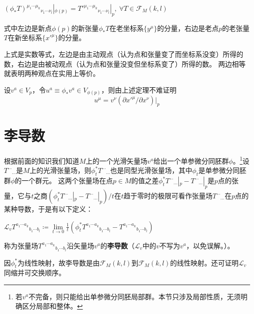 \begin{theorem}
	$(\phi_*T)^{\mu_1 \cdots \mu_k}{}_{\nu_1 \cdots \nu_l}|_{\phi(p)} = T'^{\mu_1 \cdots \mu_k}{}_{\nu_1 \cdots \nu_l}|_p, ~ \forall T \in \mathscr{F}_M(k, l)$

	式中左边是新点$\phi(p)$的新张量$\phi_*T$在老坐标系$\{y^\mu\}$的分量，右边是老点$p$的老张量$T$在新坐标系$\{x'^\mu\}$的分量。
\end{theorem}

\begin{note}
	上式是实数等式，左边是由主动观点（认为点和张量变了而坐标系没变）所得的数，右边是由被动观点（认为点和张量没变但坐标系变了）所得的数。
	两边相等就表明两种观点在实用上等价。
\end{note}

\begin{example}
	设$v^a \in V_p$，令$u^a \equiv \phi_*v^a \in V_{\phi(p)}$，则由上述定理不难证明
	$$u^\mu = v^\nu(\partial x'^\mu / \partial x^\nu)|_p$$
\end{example}

\section{李导数}

根据前面的知识我们知道$M$上的一个光滑矢量场$v^a$给出一个单参微分同胚群$\phi$。\footnote{
	若$v^a$不完备，则只能给出单参微分同胚局部群。本节只涉及局部性质，无须明确区分局部和整体。
}设$T^{\cdots}{}_{\cdots}$是$M$上的光滑张量场，则$\phi^*_tT^{\cdots}{}_{\cdots}$也是同型光滑张量场，其中$\phi_t$是单参微分同胚群$\phi$的一个群元。
这两个张量场在点$p \in M$的值之差$\phi^*_tT^{\cdots}{}_{\cdots}|_p - T^{\cdots}{}_{\cdots}|_p$是$p$点的张量，它与$t$之商$(\phi^*_tT^{\cdots}{}_{\cdots}|_p - T^{\cdots}{}_{\cdots}|_p) / t$在$t$趋于零时的极限可看作张量场$T^{\cdots}{}_{\cdots}$在$p$点的某种导数，于是有以下定义：

\begin{definition}
	$\mathscr{L}_vT^{a_1 \cdots a_k}{}_{b_1 \cdots b_l} \coloneq \lim\limits_{t \to 0}\frac{1}{t}(\phi^*_tT^{a_1 \cdots a_k}{}_{b_1 \cdots b_l} - T^{a_1 \cdots a_k}{}_{b_1 \cdots b_l})$

	称为张量场$T^{a_1 \cdots a_k}{}_{b_1 \cdots b_l}$沿矢量场$v^a$的\textbf{李导数}（$\mathscr{L}_v$中的$v$不写为$v^a$，以免误解。）。
\end{definition}

\begin{note}
	因$\phi^*_t$为线性映射，故李导数是由$\mathscr{F}_M(k, l)$到$\mathscr{F}_M(k, l)$的线性映射。还可证明$\mathscr{L}_v$同缩并可交换顺序。
\end{note}

